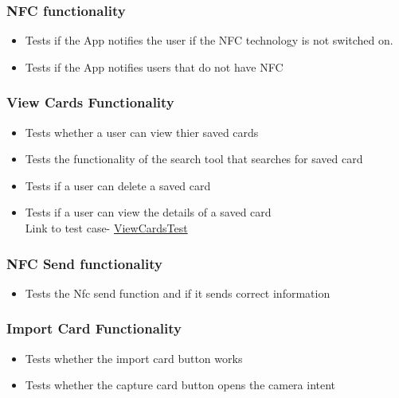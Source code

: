 \documentclass[english]{article}
\begin{document}
		\subsubsection{NFC functionality}
		\begin{itemize} 
			\item Tests if the App notifies the user if the NFC technology is not switched on.
			\item Tests if the App notifies users that do not have NFC
\\
					\href{url}{}
			
		\end{itemize}
		\subsubsection{View Cards Functionality}
		\begin{itemize}
			\item Tests whether a user can view thier saved cards
			\item Tests the functionality of the search tool that searches for saved card
			\item Tests if a user can delete a saved card
			\item Tests if a user can view the details of a saved card
\\Link to test case-
					\href{https://github.com/XoloKDandashe/Alpha-Tech/blob/master/Code/NFCBusinessCardLocal2/app/src/androidTest/java/com/example/www/nfcbusinesscardlocal/MainActivityManageCardsButtonTest.java}{ViewCardsTest}
		\end{itemize}
		\subsubsection{NFC Send functionality}
		\begin{itemize} 
			\item Tests the Nfc send function and if it sends correct information
\\
					\href{url}{}
		\end{itemize}

		\subsubsection{Import Card Functionality}
		\begin{itemize}
			\item Tests whether the import card button works
			\item Tests whether the capture card button opens the camera intent
		\\
					\href{url}{}
		\end{itemize}
\end{document}
